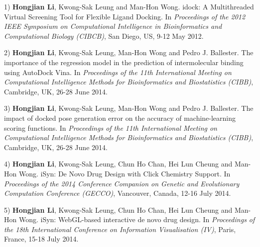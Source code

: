 1) \textbf{Hongjian Li}, Kwong-Sak Leung and Man-Hon Wong. idock: A Multithreaded Virtual Screening Tool for Flexible Ligand Docking. In \textit{Proceedings of the 2012 IEEE Symposium on Computational Intelligence in Bioinformatics and Computational Biology (CIBCB)}, San Diego, US, 9-12 May 2012.

2) \textbf{Hongjian Li}, Kwong-Sak Leung, Man-Hon Wong and Pedro J. Ballester. The importance of the regression model in the prediction of intermolecular binding using AutoDock Vina. In \textit{Proceedings of the 11th International Meeting on Computational Intelligence Methods for Bioinformatics and Biostatistics (CIBB)}, Cambridge, UK, 26-28 June 2014.

3) \textbf{Hongjian Li}, Kwong-Sak Leung, Man-Hon Wong and Pedro J. Ballester. The impact of docked pose generation error on the accuracy of machine-learning scoring functions. In \textit{Proceedings of the 11th International Meeting on Computational Intelligence Methods for Bioinformatics and Biostatistics (CIBB)}, Cambridge, UK, 26-28 June 2014.

4) \textbf{Hongjian Li}, Kwong-Sak Leung, Chun Ho Chan, Hei Lun Cheung and Man-Hon Wong. iSyn: De Novo Drug Design with Click Chemistry Support. In \textit{Proceedings of the 2014 Conference Companion on Genetic and Evolutionary Computation Conference (GECCO)}, Vancouver, Canada, 12-16 July 2014.

5) \textbf{Hongjian Li}, Kwong-Sak Leung, Chun Ho Chan, Hei Lun Cheung and Man-Hon Wong. iSyn: WebGL-based interactive de novo drug design. In \textit{Proceedings of the 18th International Conference on Information Visualisation (IV)}, Paris, France, 15-18 July 2014.

\chapterend
